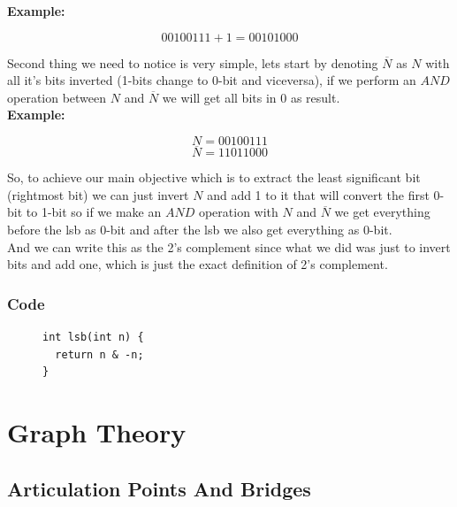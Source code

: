 \documentclass[twoside, openany]{book}
\begin{document}
\textbf{Example:}

$$00100111 + 1 = 00101000$$

Second thing we need to notice is very simple, lets start by denoting $\overline{N}$ as $N$ with all it's bits inverted (1-bits change to 0-bit and viceversa), if we perform an $AND$ operation between $N$ and $\overline{N}$ we will get all bits in $0$ as result.\\

\textbf{Example:}

$$N = 00100111$$
$$\overline{N} = 11011000$$

So, to achieve our main objective which is to extract the least significant bit (rightmost bit) we can just invert $N$ and add 1 to it that will convert the first 0-bit to 1-bit so if we make an $AND$ operation with $N$ and $\overline{N}$ we get everything before the lsb as 0-bit and after the lsb we also get everything as 0-bit.\\

And we can write this as the 2's complement since what we did was just to invert bits and add one, which is just the exact definition of 2's complement.\\

\section*{Code}

\begin{figure}[thp]
  \centering
  \begin{minipage}[c]{0.9\textwidth}
    \begin{verbatim}
int lsb(int n) {
  return n & -n;
}
      \end{verbatim}
  \end{minipage}
\end{figure}

\egroup
\vspace{1em}
\begin{multicols*}{2}
\end{multicols*}
{
\part*{Graph Theory}
}
{
\chapter*{Articulation Points And Bridges}
}
\vspace*{2em}
\end{document}
